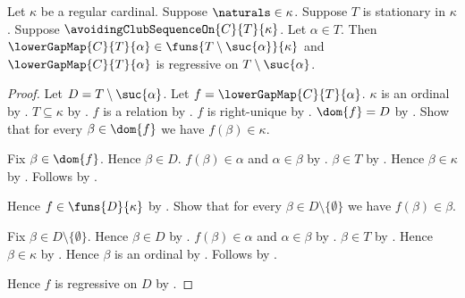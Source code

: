 \begin{theorem}\label{lower_gap_map_type_and_regressive}
    Let $\kappa$ be a regular cardinal.
    Suppose $\naturals\in\kappa$.
    Suppose $T$ is stationary in $\kappa$.
    Suppose $\avoidingClubSequenceOn{C}{T}{\kappa}$.
    Let $\alpha\in T$.
    Then $\lowerGapMap{C}{T}{\alpha}
            \in\funs{T\setminus\suc{\alpha}}{\kappa}$ and
        $\lowerGapMap{C}{T}{\alpha}$ is regressive on
            $T\setminus\suc{\alpha}$.
\end{theorem}
\begin{proof}
    Let $D=T\setminus\suc{\alpha}$.
    Let $f=\lowerGapMap{C}{T}{\alpha}$.
    $\kappa$ is an ordinal by .
    $T\subseteq\kappa$ by .
    $f$ is a relation by .
    $f$ is right-unique
        by .
    $\dom{f}=D$ by .
    Show that for every $\beta\in\dom{f}$ we have $f(\beta)\in\kappa$.
    \begin{subproof}
        Fix $\beta\in\dom{f}$.
        Hence $\beta\in D$.
        $f(\beta)\in\alpha$ and $\alpha\in\beta$
            by .
        $\beta\in T$ by .
        Hence $\beta\in\kappa$ by .
        Follows by .
    \end{subproof}
    Hence $f\in\funs{D}{\kappa}$ by .
    Show that for every $\beta\in D\setminus\{\emptyset\}$ we have
        $f(\beta)\in\beta$.
    \begin{subproof}
        Fix $\beta\in D\setminus\{\emptyset\}$.
        Hence $\beta\in D$ by .
        $f(\beta)\in\alpha$ and $\alpha\in\beta$
            by .
        $\beta\in T$ by .
        Hence $\beta\in\kappa$ by .
        Hence $\beta$ is an ordinal
            by .
        Follows by .
    \end{subproof}
    Hence $f$ is regressive on $D$ by .
\end{proof}

